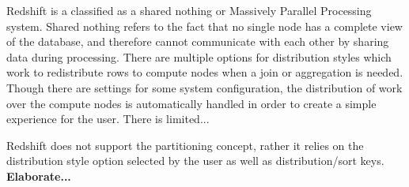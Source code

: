 \documentclass[draftclsnofoot, onecolumn, compsoc, 10pt]{IEEEtran}
\begin{document}
Redshift is a classified as a shared nothing or Massively Parallel Processing system.
Shared nothing refers to the fact that no single node has a complete view of the database, and therefore cannot communicate with each other by sharing data during processing.
There are multiple options for distribution styles which work to redistribute rows to compute nodes when a join or aggregation is needed.
Though there are settings for some system configuration, the distribution of work over the compute nodes is automatically handled in order to create a simple experience for the user. There is limited...


Redshift does not support the partitioning concept, rather it relies on the distribution style option selected by the user as well as distribution/sort keys. \textbf{Elaborate...}
\end{document}
